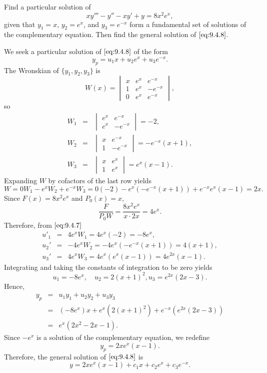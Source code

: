 \documentclass{ximera}
\begin{document}
\begin{example}\label{example:9.4.1}
 Find a particular solution of
\begin{equation} \label{eq:9.4.8}
xy'''-y''-xy'+y=8x^2e^x,
\end{equation}
given that  $y_1=x$, $y_2=e^x$, and $y_3=e^{-x}$ form a fundamental
set of solutions of the complementary equation. Then find the general
solution of $\eqref{eq:9.4.8}$.
 
\begin{explanation}
We seek a particular solution of $\eqref{eq:9.4.8}$ of the form
$$
y_p=u_1x+u_2e^x+u_3e^{-x}.
$$
The Wronskian of  $\{y_1,y_2,y_3\}$ is
$$
W(x)=\begin{vmatrix}
 x&e^x&e^{-x} \\ 1&e^x&-e^{-x} \\ 0&e^x&e^{-x}
\end{vmatrix},
$$
so
\begin{eqnarray*}
W_1&=&
\begin{vmatrix}
e^x&e^{-x}\\ e^x&-e^{-x}
\end{vmatrix}=-2,\\
W_2&=&
\begin{vmatrix}
x&e^{-x}\\1&-e^{-x}
\end{vmatrix}=-e^{-x}(x+1),\\
W_3&=&
\begin{vmatrix}
x&e^x\\1&e^x
\end{vmatrix}=e^x(x-1).
\end{eqnarray*}
Expanding $W$ by cofactors of the last row yields
$$
W=0W_1-e^x W_2+e^{-x}W_3=0(-2)-e^x\left(-e^{-x}(x+1)\right)
+e^{-x}e^x(x-1)=2x.
$$
 Since $F(x)=8x^2e^x$ and $P_0(x)=x$,
$$
\frac{F}{P_0W}=\frac{8x^2e^x}{x\cdot 2x}=4e^x.
$$
Therefore, from $\eqref{eq:9.4.7}$
\begin{eqnarray*}
u'_1&=& 4e^xW_1=4e^x(-2)=-8e^x,\\
u_2'&=&-4e^xW_2=-4e^x\left(-e^{-x}(x+1)\right)=4(x+1),\\
u_3'&=&4e^xW_3=4e^x\left(e^x(x-1)\right)=4e^{2x}(x-1).
\end{eqnarray*}
 Integrating and taking the constants of
integration to be zero yields
$$
u_1=-8e^x,\quad u_2=2(x+1)^2, u_3=e^{2x}(2x-3).
$$
Hence,
\begin{eqnarray*}
y_p&=&u_1y_1+u_2y_2+u_3y_3\\
&=&(-8e^x)x+e^x(2(x+1)^2)+e^{-x}\left(e^{2x}(2x-3)\right)
\\&=&e^x(2x^2-2x-1).
\end{eqnarray*}
Since $-e^x$ is a solution of the complementary equation, we redefine
$$
y_p=2xe^x(x-1).
$$
Therefore, the general solution of $\eqref{eq:9.4.8}$ is
$$
y=2xe^x(x-1)+c_1x+c_2e^x+c_3e^{-x}.
$$
\end{explanation}
\end{example}
\end{document}
